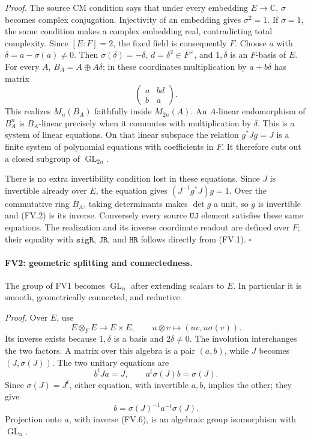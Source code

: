 \emph{Proof.}
The source CM condition says that under every embedding \(E\to\mathbb C\),
\(\sigma\) becomes complex conjugation.  Injectivity of an embedding
gives \(\sigma^2=1\).  If \(\sigma=1\), the same condition makes a complex
embedding real, contradicting total complexity.  Since \([E:F]=2\),
the fixed field is consequently \(F\).  Choose \(a\) with
\(\delta=a-\sigma(a)\ne0\).  Then \(\sigma(\delta)=-\delta\),
\(d=\delta^2\in F^\times\), and \(1,\delta\) is an \(F\)-basis of \(E\).
For every \(A\), \(B_A=A\oplus A\delta\); in these coordinates
multiplication by \(a+b\delta\) has matrix
\[
                     \begin{pmatrix}a&bd\\ b&a\end{pmatrix}.
 \tag{FV.3}
\]
This realizes \(M_n(B_A)\) faithfully inside \(M_{2n}(A)\).
An \(A\)-linear endomorphism of \(B_A^n\) is \(B_A\)-linear precisely when
it commutes with multiplication by \(\delta\).  This is a system of
linear equations.  On that linear subspace the relation \(g^*Jg=J\)
is a finite system of polynomial equations with coefficients in \(F\).
It therefore cuts out a closed subgroup of \(\operatorname{GL}_{2n}\).

There is no extra invertibility condition lost in these equations.
Since \(J\) is invertible already over \(E\), the equation gives
\((J^{-1}g^*J)g=1\).  Over the commutative ring \(B_A\), taking
determinants makes \(\det g\) a unit, so \(g\) is invertible and (FV.2)
is its inverse.  Conversely every source \(\texttt{UJ}\) element
satisfies these same equations.  The realization and its inverse
coordinate readout are defined over \(F\); their equality with
\(\texttt{sigR}\), \(\texttt{JR}\), and \(\texttt{HR}\) follows directly
from (FV.1). \(\square\)

\paragraph{FV2: geometric splitting and connectedness.}
\label{claim:FV2}
The group of FV1 becomes \(\operatorname{GL}_n\) after extending scalars
to \(E\).  In particular it is smooth, geometrically connected, and
reductive.

\emph{Proof.}
Over \(E\), use
\[
 E\otimes_F E\longrightarrow E\times E,\qquad
 u\otimes v\longmapsto(uv,u\sigma(v)).
 \tag{FV.4}
\]
Its inverse exists because \(1,\delta\) is a basis and \(2\delta\ne0\).
The involution interchanges the two factors.  A matrix over this
algebra is a pair \((a,b)\), while \(J\) becomes \((J,\sigma(J))\).
The two unitary equations are
\[
 b^tJa=J,\qquad a^t\sigma(J)b=\sigma(J).
 \tag{FV.5}
\]
Since \(\sigma(J)=J^t\), either equation, with invertible \(a,b\),
implies the other; they give
\[
              b=\sigma(J)^{-1}a^{-t}\sigma(J).
 \tag{FV.6}
\]
Projection onto \(a\), with inverse (FV.6), is an algebraic group
isomorphism with \(\operatorname{GL}_n\).

